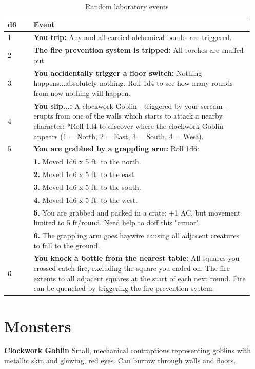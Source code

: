 \documentclass[letterpaper,sansserif,tightsqueeze]{rpg-module}
\begin{document}
\begin{table}[h]
	\caption{Random laboratory events}
	\label{tab:laboratory_events}
	\begin{tabular}{p{0.1\linewidth} | p{0.85\linewidth}}
		\textbf{d6}		& \textbf{Event} \\ \hline
		1				& \textbf{You trip:} Any and all carried alchemical bombs are triggered. \\ \hline
		2				& \textbf{The fire prevention system is tripped:} All torches are snuffed out. \\ \hline
		3				& \textbf{You accidentally trigger a floor switch:} Nothing happens...absolutely nothing. Roll 1d4 to see how many rounds from now nothing will happen. \\ \hline
		4				& \textbf{You slip...:} A clockwork Goblin - triggered by your scream - erupts from one of the walls which starts to attack a nearby character: *Roll 1d4 to discover where the clockwork Goblin appears (1 = North, 2 = East, 3 = South, 4 = West). \\ \hline
		5				& \textbf{You are grabbed by a grappling arm:} Roll 1d6: \\
						& \textbf{1.} Moved 1d6 x 5 ft. to the north. \\
						& \textbf{2.} Moved 1d6 x 5 ft. to the east. \\
						& \textbf{3.} Moved 1d6 x 5 ft. to the south. \\
						& \textbf{4.} Moved 1d6 x 5 ft. to the west. \\
						& \textbf{5.} You are grabbed and packed in a crate: +1 AC, but movement limited to 5 ft/round. Need help to doff this "armor". \\
						& \textbf{6.} The grappling arm goes haywire causing all adjacent creatures to fall to the ground. \\ \hline
		6				& \textbf{You knock a bottle from the nearest table:} All squares you crossed catch fire, excluding the square you ended on. The fire extents to all adjacent squares at the start of each next round. Fire can be quenched by triggering the fire prevention system.
	\end{tabular}
\end{table}

\newpage
\part*{Monsters}
\textbf{Clockwork Goblin}
Small, mechanical contraptions representing goblins with metallic skin and glowing, red eyes. Can burrow through walls and floors.
\end{document}
